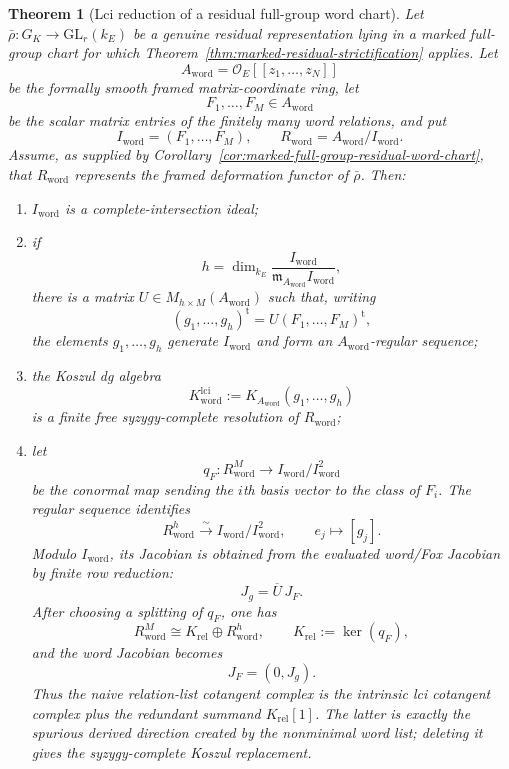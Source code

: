 \documentclass[11pt]{article}
\newtheorem{theorem}{Theorem}[section]
\theoremstyle{definition}
\begin{document}
\begin{theorem}[Lci reduction of a residual full-group word chart]\label{thm:word-lci-reduction}
Let $\bar\rho:G_K\to\mathrm{GL}_r(k_E)$ be a genuine residual representation lying in a marked full-group chart for which Theorem~\ref{thm:marked-residual-strictification} applies.  Let
\[
 A_{\mathrm{word}}
 =\mathcal O_E[[z_1,\ldots,z_N]]
\]
be the formally smooth framed matrix-coordinate ring, let
\[
 F_1,\ldots,F_M\in A_{\mathrm{word}}
\]
be the scalar matrix entries of the finitely many word relations, and put
\[
 I_{\mathrm{word}}=(F_1,\ldots,F_M),
 \qquad
 R_{\mathrm{word}}=A_{\mathrm{word}}/I_{\mathrm{word}}.
\]
Assume, as supplied by Corollary~\ref{cor:marked-full-group-residual-word-chart}, that $R_{\mathrm{word}}$ represents the framed deformation functor of $\bar\rho$.  Then:
\begin{enumerate}[label=\textnormal{(\roman*)}]
\item $I_{\mathrm{word}}$ is a complete-intersection ideal;
\item if
\[
 h=\dim_{k_E}
 \frac{I_{\mathrm{word}}}
      {\mathfrak m_{A_{\mathrm{word}}}I_{\mathrm{word}}},
\]
there is a matrix $U\in M_{h\times M}(A_{\mathrm{word}})$ such that, writing
\[
 (g_1,\ldots,g_h)^{\mathrm t}
 =U(F_1,\ldots,F_M)^{\mathrm t},
\]
the elements $g_1,\ldots,g_h$ generate $I_{\mathrm{word}}$ and form an $A_{\mathrm{word}}$-regular sequence;
\item the Koszul dg algebra
\[
 K_{\mathrm{word}}^{\mathrm{lci}}
 :=K_{A_{\mathrm{word}}}(g_1,\ldots,g_h)
\]
is a finite free syzygy-complete resolution of $R_{\mathrm{word}}$;
\item let
\[
 q_F:R_{\mathrm{word}}^{M}
 \longrightarrow
 I_{\mathrm{word}}/I_{\mathrm{word}}^2
\]
be the conormal map sending the $i$th basis vector to the class of $F_i$.  The regular sequence identifies
\[
 R_{\mathrm{word}}^{h}
 \xrightarrow{\sim}
 I_{\mathrm{word}}/I_{\mathrm{word}}^2,
 \qquad e_j\longmapsto[g_j].
\]
Modulo $I_{\mathrm{word}}$, its Jacobian is obtained from the evaluated word/Fox Jacobian by finite row reduction:
\begin{equation}\label{eq:word-lci-jacobian-reduction}
 J_g=\overline U\,J_F.
\end{equation}
After choosing a splitting of $q_F$, one has
\[
 R_{\mathrm{word}}^{M}
 \cong
 K_{\mathrm{rel}}\oplus R_{\mathrm{word}}^{h},
 \qquad K_{\mathrm{rel}}:=\ker(q_F),
\]
and the word Jacobian becomes
\begin{equation}\label{eq:word-jacobian-splitting}
 J_F=(0,J_g).
\end{equation}
Thus the naive relation-list cotangent complex is the intrinsic lci cotangent complex plus the redundant summand $K_{\mathrm{rel}}[1]$.  The latter is exactly the spurious derived direction created by the nonminimal word list; deleting it gives the syzygy-complete Koszul replacement.
\end{enumerate}
\end{theorem}
\end{document}
